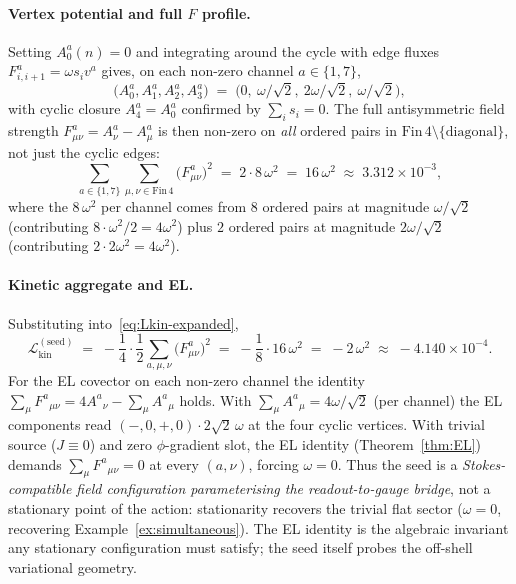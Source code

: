 \documentclass[11pt]{amsart}
\begin{document}
\paragraph{Vertex potential and full \(F\) profile.}
Setting \(A^a_0(n)=0\) and integrating around the cycle with edge fluxes \(F^a_{i,i+1}=\omega s_i v^a\) gives, on each non-zero channel \(a\in\{1,7\}\),
\[
\bigl(A^a_0,A^a_1,A^a_2,A^a_3\bigr)
\;=\;\bigl(0,\ \omega/\sqrt{2},\ 2\omega/\sqrt{2},\ \omega/\sqrt{2}\bigr),
\]
with cyclic closure \(A^a_4=A^a_0\) confirmed by \(\sum_i s_i=0\). The full antisymmetric field strength \(F^a_{\mu\nu}=A^a_\nu-A^a_\mu\) is then non-zero on \emph{all} ordered pairs in \(\mathrm{Fin}\,4\setminus\{\text{diagonal}\}\), not just the cyclic edges:
\[
\sum_{a\in\{1,7\}}\sum_{\mu,\nu\in\mathrm{Fin}\,4}\bigl(F^a_{\mu\nu}\bigr)^2
\;=\;2\cdot 8\,\omega^2
\;=\;16\,\omega^2
\;\approx\;3.312\times 10^{-3},
\]
where the \(8\,\omega^2\) per channel comes from \(8\) ordered pairs at magnitude \(\omega/\sqrt{2}\) (contributing \(8\cdot\omega^2/2=4\omega^2\)) plus \(2\) ordered pairs at magnitude \(2\omega/\sqrt{2}\) (contributing \(2\cdot 2\omega^2=4\omega^2\)).

\paragraph{Kinetic aggregate and EL.}
Substituting into~\eqref{eq:Lkin-expanded},
\[
\mathcal{L}_{\mathrm{kin}}^{(\mathrm{seed})}
\;=\;-\frac14\cdot\frac12\sum_{a,\mu,\nu}\bigl(F^a_{\mu\nu}\bigr)^2
\;=\;-\frac{1}{8}\cdot 16\,\omega^2
\;=\;-2\,\omega^2
\;\approx\;-4.140\times 10^{-4}.
\]
For the EL covector on each non-zero channel the identity \(\sum_\mu F^a{}_{\mu\nu}=4 A^a{}_\nu-\sum_\mu A^a{}_\mu\) holds. With \(\sum_\mu A^a{}_\mu=4\omega/\sqrt{2}\) (per channel) the EL components read \((-,0,+,0)\cdot 2\sqrt{2}\,\omega\) at the four cyclic vertices. With trivial source (\(J\equiv 0\)) and zero \(\phi\)-gradient slot, the EL identity (Theorem~\ref{thm:EL}) demands \(\sum_\mu F^a{}_{\mu\nu}=0\) at every \((a,\nu)\), forcing \(\omega=0\). Thus the seed is a \emph{Stokes-compatible field configuration parameterising the readout-to-gauge bridge}, not a stationary point of the action: stationarity recovers the trivial flat sector (\(\omega=0\), recovering Example~\ref{ex:simultaneous}). The EL identity is the algebraic invariant any stationary configuration must satisfy; the seed itself probes the off-shell variational geometry.
\end{document}
